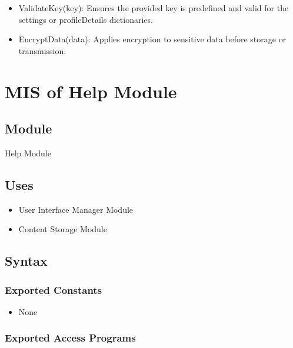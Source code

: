 \documentclass[12pt, titlepage]{article}
\begin{document}
\begin{itemize}
  \item ValidateKey(key): Ensures the provided key is predefined and valid for the settings or profileDetails dictionaries.
  \item EncryptData(data): Applies encryption to sensitive data before storage or transmission.
\end{itemize}


\newpage


\section{MIS of Help Module} \label{Module_Help}

\subsection{Module}

Help Module

\subsection{Uses}

\begin{itemize}
  \item User Interface Manager Module
  \item Content Storage Module
\end{itemize}

\subsection{Syntax}

\subsubsection{Exported Constants}

\begin{itemize}
  \item None
\end{itemize}

\subsubsection{Exported Access Programs}
\end{document}
